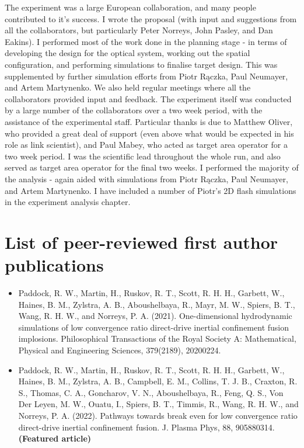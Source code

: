 The experiment was a large European collaboration, and many people contributed to it's success. I wrote the proposal (with input and suggestions from all the collaborators, but particularly Peter Norreys, John Pasley, and Dan Eakins). I performed most of the work done in the planning stage - in terms of developing the design for the optical system, working out the spatial configuration, and performing simulations to finalise target design. This was supplemented by further simulation efforts from Piotr R\k{a}czka, Paul Neumayer, and Artem Martynenko. We also held regular meetings where all the collaborators provided input and feedback. The experiment itself was conducted by a large number of the collaborators over a two week period, with the assistance of the experimental staff. Particular thanks is due to Matthew Oliver, who provided a great deal of support (even above what would be expected in his role as link scientist), and Paul Mabey, who acted as target area operator for a two week period. I was the scientific lead throughout the whole run, and also served as target area operator for the final two weeks. I performed the majority of the analysis - again aided with simulations from Piotr R\k{a}czka, Paul Neumayer, and Artem Martynenko. I have included a number of Piotr's 2D flash simulations in the experiment analysis chapter.

\section{List of peer-reviewed first author publications}

\begin{itemize}
\item Paddock, R. W., Martin, H., Ruskov, R. T., Scott, R. H. H., Garbett, W., Haines, B. M., Zylstra, A. B., Aboushelbaya, R., Mayr, M. W., Spiers, B. T., Wang, R. H. W., and Norreys, P. A. (2021). One-dimensional hydrodynamic simulations of low convergence ratio direct-drive inertial confinement fusion implosions. Philosophical Transactions of the Royal Society A: Mathematical, Physical and Engineering Sciences, 379(2189), 20200224.
\item Paddock, R. W., Martin, H., Ruskov, R. T., Scott, R. H. H., Garbett, W., Haines, B. M., Zylstra, A. B., Campbell, E. M., Collins, T. J. B., Craxton, R. S., Thomas, C. A., Goncharov, V. N., Aboushelbaya, R., Feng, Q. S., Von Der Leyen, M. W., Ouatu, I., Spiers, B. T., Timmis, R., Wang, R. H. W., and Norreys, P. A. (2022). Pathways towards break even for low convergence ratio direct-drive inertial confinement fusion. J. Plasma Phys, 88, 905880314. \textbf{(Featured article)}
\end{itemize}

